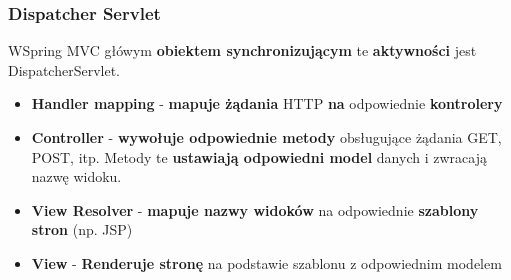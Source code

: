 \documentclass[../main.tex]{subfiles}
\begin{document}
    \subsubsection{Dispatcher Servlet}
    WSpring MVC główym \textbf{obiektem synchronizującym} te \textbf{aktywności} jest DispatcherServlet.
    \begin{itemize}
        \item \textbf{Handler mapping} - \textbf{mapuje żądania} HTTP \textbf{na} odpowiednie \textbf{kontrolery}
        \item \textbf{Controller} - \textbf{wywołuje odpowiednie metody} obsługujące żądania GET, POST, itp. Metody te
        \textbf{ustawiają odpowiedni model} danych i zwracają nazwę widoku.
        \item \textbf{View Resolver} - \textbf{mapuje nazwy widoków} na odpowiednie \textbf{szablony stron} (np. JSP)
        \item \textbf{View} - \textbf{Renderuje stronę} na podstawie szablonu z odpowiednim modelem
    \end{itemize}
\end{document}
